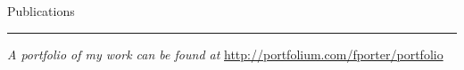 \documentclass[12pt, oneside]{article}
\newcommand{\headingstyleJobs}[1] {
	{\fontsize{19pt}{1em}\selectfont \textcolor{new_red}{\textsf{#1}}}
	\textcolor{new_red}{\rule{3.25in}{0.5pt}} \vspace{3pt}
}
\newcommand{\jobtitle}[3] {
	{\bf #1} · {#2} · {#3} \vspace{-7pt} \\
}
\begin{document}
\begin{flushleft}


\headingstyleJobs{Publications}

\vspace{-9pt}
\nocite{OWMS}




\textit{A portfolio of my work can be found at} \url{http://portfolium.com/fporter/portfolio}

\end{flushleft}
\end{document}
